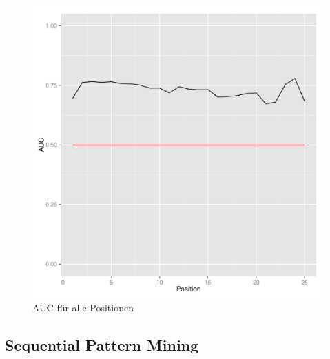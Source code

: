 \begin{figure}[H]
	\centering\includegraphics[scale=0.75]{auc.pdf}\caption{AUC für alle Positionen}\label{auc}
\end{figure}

\subsection{Sequential Pattern Mining}

